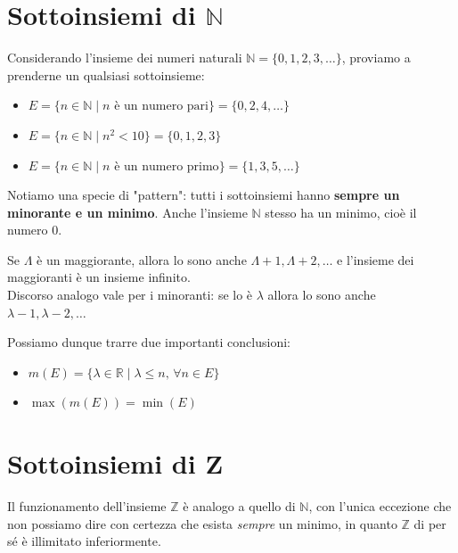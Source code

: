 \documentclass[12pt]{report}
\newcommand{\N}{\mathbb{N}}
\newcommand{\Z}{\mathbb{Z}}
\newcommand{\R}{\mathbb{R}}
\begin{document}
	\section{Sottoinsiemi di $\N$}
	Considerando l'insieme dei numeri naturali $\N = \{0, 1, 2, 3, \dots\}$, proviamo a prenderne un qualsiasi sottoinsieme:
	\begin{itemize}
		
		\item $E = \{n \in \N \mid n \text{ è un numero pari}\} = \{0, 2, 4, \dots\}$
		
		\item $E = \{n \in \N \mid n^2 < 10\} = \{0, 1, 2, 3\}$
		
		\item $E = \{n \in \N \mid n \text{ è un numero primo}\} = \{1, 3, 5, \dots\}$
		
	\end{itemize}

	Notiamo una specie di "pattern": tutti i sottoinsiemi hanno \textbf{sempre un minorante e un minimo}. Anche l'insieme $\N$ stesso ha un minimo, cioè il numero $0$.
	
	\begin{osservazione}{}{}
		
		Se $\Lambda$ è un maggiorante, allora lo sono anche $\Lambda + 1, \Lambda + 2, \dots$ e l'insieme dei maggioranti è un insieme infinito.\\		
		Discorso analogo vale per i minoranti: se lo è $\lambda$ allora lo sono anche $\lambda - 1, \lambda - 2, \dots$
		
	\end{osservazione}

	Possiamo dunque trarre due importanti conclusioni:

	\begin{itemize}
		
		\item $m(E) = \{\lambda \in \R \mid \lambda \leq n,\, \forall n \in E\}$
		
		\item $\max(m(E)) = \min(E)$
		
	\end{itemize}

	\section{Sottoinsiemi di Z}
	Il funzionamento dell'insieme $\Z$ è analogo a quello di $\N$, con l'unica eccezione che non possiamo dire con certezza che esista \textit{sempre} un minimo, in quanto $\Z$ di per sé è illimitato inferiormente.\\
\end{document}
